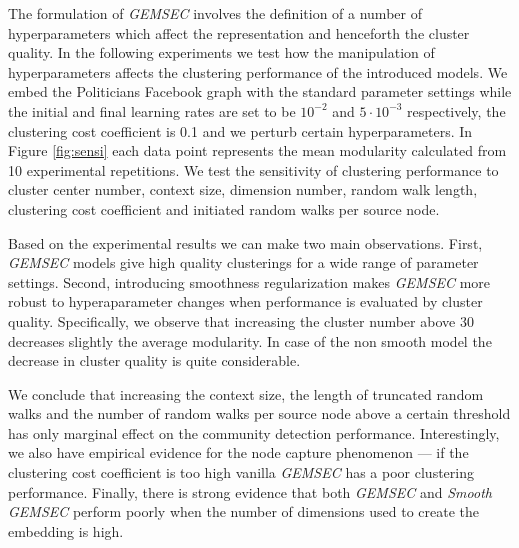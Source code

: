 The formulation of \textit{GEMSEC} involves the definition of a number of hyperparameters which affect the representation and henceforth the cluster quality. In the following experiments we test how the manipulation of hyperparameters affects the clustering performance of the introduced models. We embed the Politicians Facebook graph with the standard parameter settings while  the initial and final learning rates are set to be $10^{-2}$ and $5\cdot 10^{-3}$ respectively, the clustering cost coefficient is 0.1 and we perturb certain hyperparameters. In Figure \ref{fig:sensi} each data point represents the mean modularity calculated from 10 experimental repetitions. We test the sensitivity of clustering performance to cluster center number, context size, dimension number, random walk length, clustering cost coefficient and initiated random walks per source node.

Based on the experimental results we can make two main observations. First, \textit{GEMSEC} models give high quality clusterings for a wide range of parameter settings. Second, introducing smoothness regularization makes \textit{GEMSEC} more robust to hyperaparameter changes when performance is evaluated by cluster quality. Specifically, we observe that increasing the cluster number above 30 decreases slightly the average modularity. In case of the non smooth model the decrease in cluster quality is quite considerable.

 We conclude that increasing the context size, the length of truncated random walks and the number of random walks per source node above a certain threshold has only marginal effect on the community detection performance. Interestingly, we also have empirical evidence for the node capture phenomenon --- if the clustering cost coefficient is too high vanilla \textit{GEMSEC} has a poor clustering performance. Finally, there is strong evidence that both \textit{GEMSEC} and \textit{Smooth GEMSEC} perform poorly when the number of dimensions used to create the embedding is high.
 
